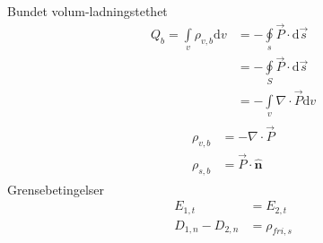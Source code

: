 \documentclass[a4paper,10pt,english]{article}
\newcommand{\dd}[1]{\mathrm{d}#1}
\newcommand{\uvec}[1]{\boldsymbol{\hat{\textbf{#1}}}}
\begin{document}
Bundet volum-ladningstethet
\begin{align*}
	Q_b = \int \limits_v \rho_{v,b} \dd{ v} &= - \oint \limits_s \vec{P} \cdot \dd{ \vec{s}} \\
						&= - \oint \limits_S \vec{P} \cdot \dd{ \vec{s}}\\
						&= - \int\limits_v \nabla \cdot \vec{P} \dd{ v} 
\end{align*}
\begin{align*}
	\boxed{
		\begin{aligned}
			\rho_{v,b} &= - \nabla \cdot \vec{P}\\
			\rho_{s,b}  &= \vec{P} \cdot \uvec{n}
	\end{aligned}}
\end{align*}
Grensebetingelser
\begin{align*}
	E_{1,t} &= E_{2,t}\\
	D_{1,n}-D_{2,n} &= \rho_{fri,s}
\end{align*}
\end{document}
